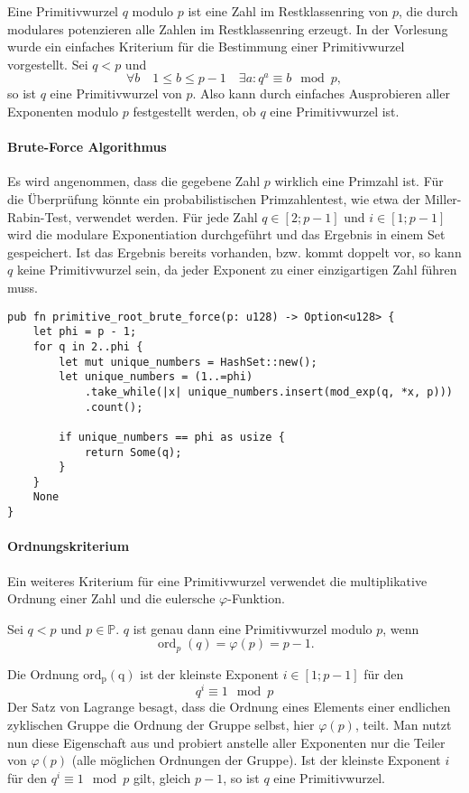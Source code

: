 Eine Primitivwurzel $q$ modulo $p$ ist eine Zahl im Restklassenring von $p$,
die durch modulares potenzieren alle Zahlen im Restklassenring erzeugt.
In der Vorlesung wurde ein einfaches Kriterium für die Bestimmung einer
Primitivwurzel vorgestellt. Sei $q < p$ und
\[
    \forall b\quad 1 \leq b \leq p - 1\quad \exists a: q^a \equiv b\mod p,
\]
so ist $q$ eine Primitivwurzel von $p$. Also kann durch einfaches Ausprobieren 
aller Exponenten modulo $p$ festgestellt werden, ob $q$ eine Primitivwurzel
ist. 
\paragraph{Brute-Force Algorithmus}
Es wird angenommen, dass die gegebene Zahl $p$ wirklich eine Primzahl ist. Für die Überprüfung könnte
ein probabilistischen Primzahlentest, wie etwa der Miller-Rabin-Test, verwendet werden.
Für jede Zahl $q\in [2; p - 1]$ und $i\in[1; p-1]$ wird die modulare Exponentiation durchgeführt
und das Ergebnis in einem Set gespeichert. Ist das Ergebnis bereits vorhanden, bzw. kommt doppelt vor,
so kann $q$ keine Primitivwurzel sein, da jeder Exponent zu einer einzigartigen Zahl führen muss.
\begin{verbatim}
pub fn primitive_root_brute_force(p: u128) -> Option<u128> {
    let phi = p - 1;
    for q in 2..phi {
        let mut unique_numbers = HashSet::new();
        let unique_numbers = (1..=phi)
            .take_while(|x| unique_numbers.insert(mod_exp(q, *x, p)))
            .count();

        if unique_numbers == phi as usize {
            return Some(q);
        }
    }
    None
}
\end{verbatim}
\paragraph{Ordnungskriterium}
Ein weiteres Kriterium für eine Primitivwurzel verwendet die multiplikative Ordnung einer
Zahl und die eulersche $\varphi$-Funktion.
\begin{korollar}[Primitivwurzel]
    Sei $q < p$ und $p\in\mathbb{P}$. $q$ ist genau dann eine Primitivwurzel modulo $p$, wenn
    \[
        \operatorname{ord}_p(q) = \varphi(p) = p - 1. 
    \]
\end{korollar}
Die Ordnung $\operatorname{ord_p(q)}$ ist der kleinste Exponent $i\in[1;p-1]$ für
den
\[
    q^i \equiv 1 \mod p
\]
Der Satz von Lagrange besagt, dass die Ordnung eines Elements einer endlichen zyklischen Gruppe die Ordnung
der Gruppe selbst, hier $\varphi(p)$, teilt. Man nutzt nun diese Eigenschaft aus und probiert anstelle aller Exponenten
nur die Teiler von $\varphi(p)$ (alle möglichen Ordnungen der Gruppe). Ist der kleinste Exponent $i$ für den $q^i\equiv 1\mod p$ gilt,
gleich $p-1$, so ist $q$ eine Primitivwurzel.

